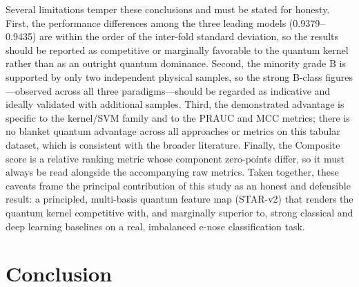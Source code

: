 \documentclass{ieeeaccess}
\begin{document}
Several limitations temper these conclusions and must be stated for honesty. First, the performance differences among the three leading models (0.9379--0.9435) are within the order of the inter-fold standard deviation, so the results should be reported as competitive or marginally favorable to the quantum kernel rather than as an outright quantum dominance. Second, the minority grade B is supported by only two independent physical samples, so the strong B-class figures---observed across all three paradigms---should be regarded as indicative and ideally validated with additional samples. Third, the demonstrated advantage is specific to the kernel/SVM family and to the PRAUC and MCC metrics; there is no blanket quantum advantage across all approaches or metrics on this tabular dataset, which is consistent with the broader literature. Finally, the Composite score is a relative ranking metric whose component zero-points differ, so it must always be read alongside the accompanying raw metrics. Taken together, these caveats frame the principal contribution of this study as an honest and defensible result: a principled, multi-basis quantum feature map (STAR-v2) that renders the quantum kernel competitive with, and marginally superior to, strong classical and deep learning baselines on a real, imbalanced e-nose classification task.

\section{Conclusion}
\end{document}
